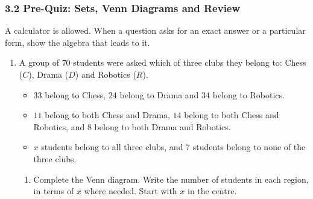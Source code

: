 \documentclass[12pt, twoside]{article}
\begin{document}
\subsubsection*{3.2 Pre-Quiz: Sets, Venn Diagrams and Review}

A calculator is allowed. When a question asks for an exact answer or a
particular form, show the algebra that leads to it.

\begin{enumerate}[itemsep=0.15cm]

\item[1.]
A group of $70$ students were asked which of three clubs they belong to:
Chess ($C$), Drama ($D$) and Robotics ($R$).

\begin{itemize}[itemsep=0cm, topsep=0.1cm]
  \item $33$ belong to Chess, $24$ belong to Drama and $34$ belong to Robotics.
  \item $11$ belong to both Chess and Drama, $14$ belong to both Chess and
  Robotics, and $8$ belong to both Drama and Robotics.
  \item $x$ students belong to all three clubs, and $7$ students belong to
  none of the three clubs.
\end{itemize}

\begin{enumerate}[itemsep=0.1cm]
  \item Complete the Venn diagram. Write the number of students in each
  region, in terms of $x$ where needed. Start with $x$ in the centre.
\end{enumerate}


\end{enumerate}
\end{document}
